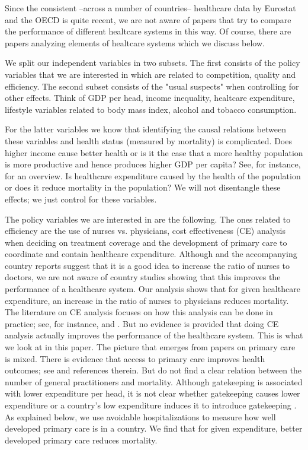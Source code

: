 \documentclass{article}
\begin{document}
Since the consistent --across a number of countries-- healthcare data by Eurostat and the OECD is quite recent, we are not aware of papers that try to compare the performance of different healtcare systems in this way. Of course, there are papers analyzing elements of healtcare systems which we discuss below.

We split our independent variables in two subsets. The first consists of the policy variables that we are interested in which are related to competition, quality and efficiency. The second subset consists of the "usual suspects" when controlling for other effects. Think of GDP per head, income inequality, healtcare expenditure, lifestyle variables related to body mass index, alcohol and tobacco consumption.

For the latter variables we know that identifying the causal relations between these variables and health status (measured by mortality) is complicated. Does higher income cause better health or is it the case that a more healthy population is more productive and hence produces higher GDP per capita? See, for instance, \cite{socioeconomicstatus} for an overview. Is healthcare expenditure caused by the health of the population or does it reduce mortality in the population? We will not disentangle these effects; we just control for these variables.

The policy variables we are interested in are the following. The ones related to efficiency are the use of nurses vs. physicians, cost effectiveness (CE) analysis when deciding on treatment coverage and the development of primary care to coordinate and contain healthcare expenditure. Although \cite{countryprofileReport} and the accompanying country reports suggest that it is a good idea to increase the ratio of nurses to doctors, we are not aware of country studies showing that this improves the performance of a healthcare system. Our analysis shows that for given healthcare expenditure, an increase in the ratio of nurses to physicians reduces mortality. The literature on CE analysis focuses on how this analysis can be done in practice; see, for instance, \cite{Drummond2005} and \cite{Gold96e}. But no evidence is provided that doing CE analysis actually improves the performance of the healthcare system. This is what we look at in this paper. The picture that emerges from papers on primary care is mixed. There is evidence that access to primary care improves health outcomes; see \cite{starfield2005} and references therein. But \cite{AAKVIK20061139} do not find a clear relation between the number of general practitioners and mortality. Although gatekeeping is associated with lower expenditure per head, it is not clear whether gatekeeping causes lower expenditure or a country's low expenditure induces it to introduce gatekeeping \citep{Forrest692}. As explained below, we use avoidable hospitalizations to measure how well developed primary care is in a country. We find that for given expenditure, better developed primary care reduces mortality.
\end{document}

